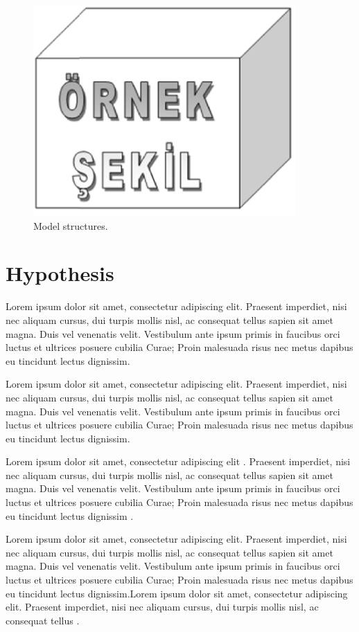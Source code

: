 \begin{figure}
 \centering
 \includegraphics[width=10cm,keepaspectratio=true]{./fig/sekil1}
 \caption{Model structures.}
\end{figure}

\section{Hypothesis}

Lorem ipsum dolor sit amet, consectetur adipiscing elit. Praesent imperdiet, nisi 
nec aliquam cursus, dui turpis mollis nisl, ac consequat tellus sapien sit amet 
magna. Duis vel venenatis velit. Vestibulum ante ipsum primis in faucibus orci 
luctus et ultrices posuere cubilia Curae; Proin malesuada risus nec metus dapibus 
eu tincidunt lectus dignissim. 

Lorem ipsum dolor sit amet, consectetur adipiscing elit. Praesent imperdiet, nisi 
nec aliquam cursus, dui turpis mollis nisl, ac consequat tellus sapien sit amet 
magna. Duis vel venenatis velit. Vestibulum ante ipsum primis in faucibus orci 
luctus et ultrices posuere cubilia Curae; Proin malesuada risus nec metus dapibus 
eu tincidunt lectus dignissim. 

Lorem ipsum dolor sit amet, consectetur adipiscing elit \cite{harper2007}. Praesent imperdiet, nisi 
nec aliquam cursus, dui turpis mollis nisl, ac consequat tellus sapien sit amet 
magna. Duis vel venenatis velit. Vestibulum ante ipsum primis in faucibus orci 
luctus et ultrices posuere cubilia Curae; Proin malesuada risus nec metus dapibus 
eu tincidunt lectus dignissim \cite{unesco}.

Lorem ipsum dolor sit amet, consectetur adipiscing elit. Praesent imperdiet, nisi 
nec aliquam cursus, dui turpis mollis nisl, ac consequat tellus sapien sit amet 
magna. Duis vel venenatis velit. Vestibulum ante ipsum primis in faucibus orci 
luctus et ultrices posuere cubilia Curae; Proin malesuada risus nec metus dapibus 
eu tincidunt lectus dignissim.Lorem ipsum dolor sit amet, consectetur adipiscing elit. 
Praesent imperdiet, nisi nec aliquam cursus, dui turpis mollis nisl, ac consequat 
tellus \cite{mccaffrey88} \cite{moore91} \cite{nelson88}
\cite{sisaky} \cite{simpsondvd} \cite{startrek} \cite{TS-40561} \cite{url-1} \cite{url-2}
\cite{vanden2001}.

